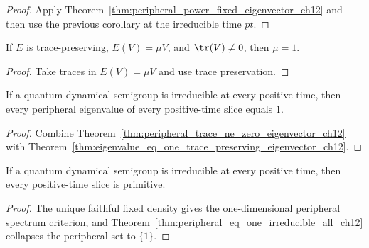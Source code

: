 \begin{proof}
    \leanok
    Apply Theorem~\ref{thm:peripheral_power_fixed_eigenvector_ch12} and then use the previous
    corollary at the irreducible time $pt$.
\end{proof}

\begin{theorem}
    \label{thm:eigenvalue_eq_one_trace_preserving_eigenvector_ch12}
    \leanok
    If $E$ is trace-preserving, $E(V)=\mu V$, and $\tr(V)\ne 0$, then $\mu=1$.
\end{theorem}

\begin{proof}
    \leanok
    Take traces in $E(V)=\mu V$ and use trace preservation.
\end{proof}

\begin{theorem}
    \label{thm:peripheral_eq_one_irreducible_all_ch12}
    \leanok
    If a quantum dynamical semigroup is irreducible at every positive time, then every
    peripheral eigenvalue of every positive-time slice equals $1$.
\end{theorem}

\begin{proof}
    \leanok
    Combine Theorem~\ref{thm:peripheral_trace_ne_zero_eigenvector_ch12} with
    Theorem~\ref{thm:eigenvalue_eq_one_trace_preserving_eigenvector_ch12}.
\end{proof}

\begin{theorem}
    \label{thm:primitive_of_irreducible_all_ch12}
    \leanok
    If a quantum dynamical semigroup is irreducible at every positive time, then every
    positive-time slice is primitive.
\end{theorem}

\begin{proof}
    \leanok
    The unique faithful fixed density gives the one-dimensional peripheral spectrum criterion,
    and Theorem~\ref{thm:peripheral_eq_one_irreducible_all_ch12} collapses the peripheral set
    to $\{1\}$.
\end{proof}

